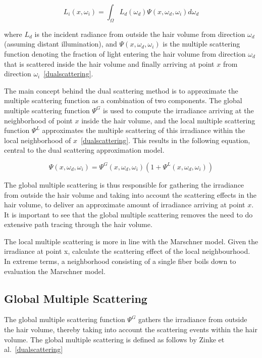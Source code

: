 \begin{equation}
L_i(x, \omega_i) = \int_{\Omega} L_d(\omega_d) \Psi(x, \omega_d, \omega_i) d\omega_d
\end{equation}

where $L_d$ is the incident radiance from outside the hair volume from direction $\omega_d$ (assuming distant illumination), and $\Psi(x, \omega_d, \omega_i)$ is the multiple scattering function denoting the fraction of light entering the hair volume from direction $\omega_d$ that is scattered inside the hair volume and finally arriving at point $x$ from direction $\omega_i$~\ref{dualscattering}.


%
%

The main concept behind the dual scattering method is to approximate the multiple scattering function as a combination of two components. The global multiple scattering function $\Psi^G$ is used to compute the irradiance arriving at the neighborhood of point $x$ inside the hair volume, and the local multiple scattering function $\Psi^L$ approximates the multiple scattering of this irradiance within the local neighborhood of $x$~\ref{dualscattering}.
This results in the following equation, central to the dual scattering approximation model.

\begin{equation}
\Psi(x, \omega_d, \omega_i) = \Psi^G(x, \omega_d, \omega_i) (1 + \Psi^L(x, \omega_d, \omega_i))
\end{equation}

The global multiple scattering is thus responsible for gathering the irradiance from outside the hair volume and taking into account the scattering effects in the hair volume, to deliver an approximate amount of irradiance arriving at point $x$. It is important to see that the global multiple scattering removes the need to do extensive path tracing through the hair volume.

The local multiple scattering is more in line with the Marschner model. Given the irradiance at point x, calculate the scattering effect of the local neighbourhood. In extreme terms, a neighborhood consisting of a single fiber boils down to evaluation the Marschner model.

\subsection{Global Multiple Scattering}

The global multiple scattering function $\Psi^G$ gathers the irradiance from outside the hair volume, thereby taking into account the scattering events within the hair volume. The global multiple scattering is defined as follows by Zinke et al.~\ref{dualscattering}

